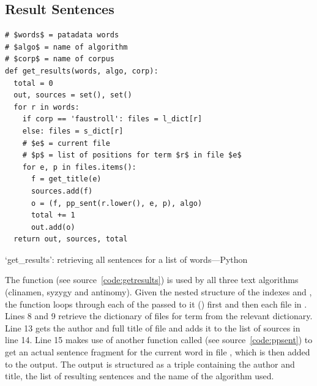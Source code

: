 \subsection{Result Sentences}
\label{s:ressent}


\begin{listing}[!htbp] %
  \begin{verbatim}
# $words$ = patadata words
# $algo$ = name of algorithm
# $corp$ = name of corpus
def get_results(words, algo, corp):
  total = 0
  out, sources = set(), set()
  for r in words:
    if corp == 'faustroll': files = l_dict[r]
    else: files = s_dict[r]
    # $e$ = current file
    # $p$ = list of positions for term $r$ in file $e$
    for e, p in files.items():
      f = get_title(e)
      sources.add(f)
      o = (f, pp_sent(r.lower(), e, p), algo)
      total += 1
      out.add(o)
  return out, sources, total
  \end{verbatim}
\caption[`get\_results' function---Python]{`get\_results': retrieving all sentences for a list of words---Python}
\label{code:getresults}
\end{listing}

The  function (see source~\ref{code:getresults}) is used by all three text algorithms (clinamen, syzygy and antinomy). Given the nested structure of the indexes  and , the function loops through each of the  passed to it () first and then each file in . Lines 8 and 9 retrieve the dictionary of files for term  from the relevant dictionary. Line 13 gets the author and full title of file  and adds it to the list of sources in line 14. Line 15 makes use of another function called  (see source~\ref{code:ppsent}) to get an actual sentence fragment for the current word  in file , which is then added to the output. The output is structured as a triple containing the author and title, the list of resulting sentences and the name of the algorithm used.

